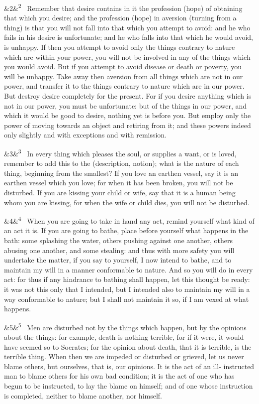\documentclass[12pt]{article}
\newcommand{\para}[1][]{\par\noindent\ifx&#1&\else\textsuperscript{\footnotesize #1}~\fi}
\begin{document}
\para[2] Remember that desire contains in it the profession (hope) of obtaining that which you desire; and the profession (hope) in aversion (turning from a thing) is that you will not fall into that which you attempt to avoid: and he who fails in his desire is unfortunate; and he who falls into that which he would avoid, is unhappy. If then you attempt to avoid only the things contrary to nature which are within your power, you will not be involved in any of the things which you would avoid. But if you attempt to avoid disease or death or poverty, you will be unhappy. Take away then aversion from all things which are not in our power, and transfer it to the things contrary to nature which are in our power. But destroy desire completely for the present. For if you desire anything which is not in our power, you must be unfortunate: but of the things in our power, and which it would be good to desire, nothing yet is before you. But employ only the power of moving towards an object and retiring from it; and these powers indeed only slightly and with exceptions and with remission.

\para[3] In every thing which pleases the soul, or supplies a want, or is loved, remember to add this to the (description, notion); what is the nature of each thing, beginning from the smallest? If you love an earthen vessel, say it is an earthen vessel which you love; for when it has been broken, you will not be disturbed. If you are kissing your child or wife, say that it is a human being whom you are kissing, for when the wife or child dies, you will not be disturbed.

\para[4] When you are going to take in hand any act, remind yourself what kind of an act it is. If you are going to bathe, place before yourself what happens in the bath: some splashing the water, others pushing against one another, others abusing one another, and some stealing: and thus with more safety you will undertake the matter, if you say to yourself, I now intend to bathe, and to maintain my will in a manner conformable to nature. And so you will do in every act: for thus if any hindrance to bathing shall happen, let this thought be ready: it was not this only that I intended, but I intended also to maintain my will in a way conformable to nature; but I shall not maintain it so, if I am vexed at what happens.

\para[5] Men are disturbed not by the things which happen, but by the opinions about the things: for example, death is nothing terrible, for if it were, it would have seemed so to Socrates; for the opinion about death, that it is terrible, is the terrible thing. When then we are impeded or disturbed or grieved, let us never blame others, but ourselves, that is, our opinions. It is the act of an ill- instructed man to blame others for his own bad condition; it is the act of one who has begun to be instructed, to lay the blame on himself; and of one whose instruction is completed, neither to blame another, nor himself.
\end{document}
